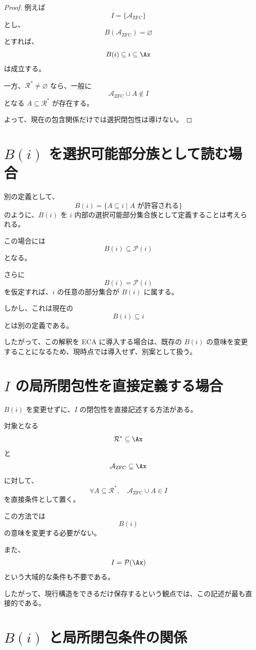 \documentclass[a4paper,11pt]{ltjsarticle}
\begin{document}
\begin{proof}
例えば
\[
I=\{\mathcal{A}_{\mathrm{ZFC}}\}
\]
とし、
\[
B(\mathcal{A}_{\mathrm{ZFC}})
=
\varnothing
\]
とすれば、
\[
B(i)\subseteq i\subseteq\Ax
\]
は成立する。

一方、$\mathcal{R}^*\neq\varnothing$ なら、一般に
\[
\mathcal{A}_{\mathrm{ZFC}}\cup A
\notin I
\]
となる $A\subseteq\mathcal{R}^*$ が存在する。

よって、現在の包含関係だけでは選択閉包性は導けない。
\end{proof}

\section{$B(i)$ を選択可能部分族として読む場合}

別の定義として、
\[
B(i)
=
\{A\subseteq i\mid A\text{ が許容される}\}
\]
のように、$B(i)$ を $i$ 内部の選択可能部分集合族として定義することは考えられる。

この場合には
\[
B(i)\subseteq\mathcal{P}(i)
\]
となる。

さらに
\[
B(i)=\mathcal{P}(i)
\]
を仮定すれば、$i$ の任意の部分集合が $B(i)$ に属する。

しかし、これは現在の
\[
B(i)\subseteq i
\]
とは別の定義である。

したがって、この解釈を ECA に導入する場合は、既存の $B(i)$ の意味を変更することになるため、現時点では導入せず、別案として扱う。

\section{$I$ の局所閉包性を直接定義する場合}

$B(i)$ を変更せずに、$I$ の閉包性を直接記述する方法がある。

対象となる
\[
\mathcal{R}^*\subseteq\Ax
\]
と
\[
\mathcal{A}_{\mathrm{ZFC}}\subseteq\Ax
\]
に対して、
\[
\boxed{
\forall A\subseteq\mathcal{R}^*,
\quad
\mathcal{A}_{\mathrm{ZFC}}\cup A\in I
}
\]
を直接条件として置く。

この方法では
\[
B(i)
\]
の意味を変更する必要がない。

また、
\[
I=\mathcal{P}(\Ax)
\]
という大域的な条件も不要である。

したがって、現行構造をできるだけ保存するという観点では、この記述が最も直接的である。

\section{$B(i)$ と局所閉包条件の関係}
\end{document}
